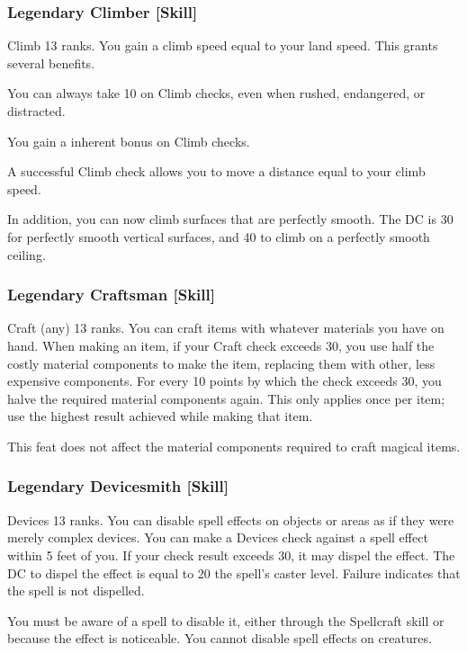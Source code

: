 \subsubsection{Legendary Climber [Skill]}
\featpre Climb 13 ranks.
\featben You gain a climb speed equal to your land speed. This grants several benefits. 
\begin{itemize*}
  \item You can always take 10 on Climb checks, even when rushed, endangered, or distracted. 
  \item You gain a  inherent bonus on Climb checks.
  \item A successful Climb check allows you to move a distance equal to your climb speed.
\end{itemize*}

In addition, you can now climb surfaces that are perfectly smooth. The DC is 30 for perfectly smooth vertical surfaces, and 40 to climb on a perfectly smooth ceiling.

\subsubsection{Legendary Craftsman [Skill]}
\featpre Craft (any) 13 ranks.
\featben You can craft items with whatever materials you have on hand. When making an item, if your Craft check exceeds 30, you use half the costly material components to make the item, replacing them with other, less expensive components. For every 10 points by which the check exceeds 30, you halve the required material components again. This only applies once per item; use the highest result achieved while making that item.

This feat does not affect the material components required to craft magical items.

\subsubsection{Legendary Devicesmith [Skill]}
\featpre Devices 13 ranks.
\featben You can disable spell effects on objects or areas as if they were merely complex devices. You can make a Devices check against a spell effect within 5 feet of you. If your check result exceeds 30, it may dispel the effect. The DC to dispel the effect is equal to 20 \add the spell's caster level. Failure indicates that the spell is not dispelled. 

You must be aware of a spell to disable it, either through the Spellcraft skill or because the effect is noticeable. You cannot disable spell effects on creatures.

